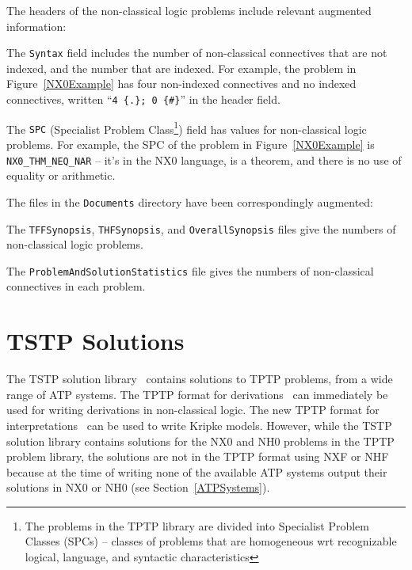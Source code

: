 \documentclass{ceurart}
\newenvironment{packed_itemize}{
\vspace*{-0.5em}
\begin{itemize}
\setlength{\partopsep}{0pt}
\setlength{\itemsep}{1pt}
\setlength{\parskip}{0pt}
\setlength{\parsep}{0pt}
}{\end{itemize}}
\begin{document}
The headers of the non-classical logic problems include relevant augmented information:
\begin{packed_itemize}
\item The {\tt Syntax} field includes the number of non-classical connectives that are not indexed,
      and the number that are indexed.
      For example, the problem in Figure~\ref{NX0Example} has four non-indexed connectives and
      no indexed connectives, written ``{\tt 4 \{.\};   0 \{\#\}}'' in the header field.
\item The {\tt SPC} (Specialist Problem Class\footnote{%
      The problems in the TPTP library are divided into Specialist Problem Classes (SPCs) – 
      classes of problems that are homogeneous wrt recognizable logical, language, and syntactic 
      characteristics}) field has values for non-classical logic problems. 
      For example, the SPC of the problem in Figure~\ref{NX0Example} is {\tt NX0\_THM\_NEQ\_NAR} 
      -- it's in the NX0 language, is a theorem, and there is no use of equality or arithmetic.
\end{packed_itemize}

The files in the {\tt Documents} directory have been correspondingly augmented:
\begin{packed_itemize}
\item The {\tt TFFSynopsis}, {\tt THFSynopsis}, and {\tt OverallSynopsis} files give the numbers 
      of non-classical logic problems.
\item The {\tt ProblemAndSolutionStatistics} file gives the numbers of non-classical
      connectives in each problem.
\end{packed_itemize}

\section{TSTP Solutions}
\label{TSTP}

The TSTP solution library~\cite{Sut07-CSR} contains solutions to TPTP problems, from a wide range
of ATP systems.
The TPTP format for derivations~\cite{SS+06} can immediately be used for writing derivations in
non-classical logic.
The new TPTP format for interpretations~\cite{SS+23-LPAR} can be used to write Kripke models.
However, while the TSTP solution library contains solutions for the NX0 and NH0 problems in the 
TPTP problem library, the solutions are not in the TPTP format using NXF or NHF because
at the time of writing none of the available ATP systems output their solutions in NX0 or NH0 
(see Section~\ref{ATPSystems}).
\end{document}
